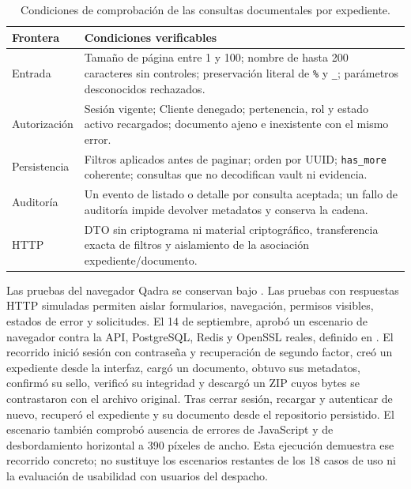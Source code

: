 \begin{table}[H]
  \centering
  \caption{Condiciones de comprobación de las consultas documentales por expediente.}
  \label{tab:pruebas-consultas}
  \begin{tabularx}{\linewidth}{@{}L{3.2cm} X@{}}
    \toprule
    \textbf{Frontera} & \textbf{Condiciones verificables} \\
    \midrule
    Entrada & Tamaño de página entre 1 y 100; nombre de hasta 200 caracteres sin controles; preservación literal de \texttt{\%} y \texttt{\_}; parámetros desconocidos rechazados. \\
    Autorización & Sesión vigente; Cliente denegado; pertenencia, rol y estado activo recargados; documento ajeno e inexistente con el mismo error. \\
    Persistencia & Filtros aplicados antes de paginar; orden por UUID; \texttt{has\_more} coherente; consultas que no decodifican vault ni evidencia. \\
    Auditoría & Un evento de listado o detalle por consulta aceptada; un fallo de auditoría impide devolver metadatos y conserva la cadena. \\
    HTTP & DTO sin criptograma ni material criptográfico, transferencia exacta de filtros y aislamiento de la asociación expediente/documento. \\
    \bottomrule
  \end{tabularx}
\end{table}

Las pruebas del navegador Qadra se conservan bajo . Las pruebas con respuestas HTTP simuladas permiten aislar formularios, navegación, permisos visibles, estados de error y solicitudes. El 14 de septiembre,  aprobó un escenario de navegador contra la API, PostgreSQL, Redis y OpenSSL reales, definido en . El recorrido inició sesión con contraseña y recuperación de segundo factor, creó un expediente desde la interfaz, cargó un documento, obtuvo sus metadatos, confirmó su sello, verificó su integridad y descargó un ZIP cuyos bytes se contrastaron con el archivo original. Tras cerrar sesión, recargar y autenticar de nuevo, recuperó el expediente y su documento desde el repositorio persistido. El escenario también comprobó ausencia de errores de JavaScript y de desbordamiento horizontal a 390 píxeles de ancho. Esta ejecución demuestra ese recorrido concreto; no sustituye los escenarios restantes de los 18 casos de uso ni la evaluación de usabilidad con usuarios del despacho.

